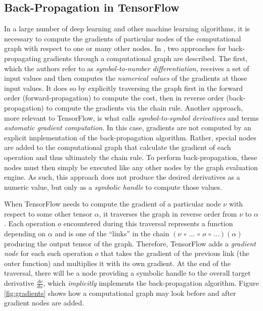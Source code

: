 \subsection{Back-Propagation in TensorFlow}\label{sec:model-ext-backprop}

In a large number of deep learning and other machine learning algorithms, it is
necessary to compute the gradients of particular nodes of the computational
graph with respect to one or many other nodes. In \cite{goodfellow2016}, two
approaches for back-propagating gradients through a computational graph are
described. The first, which the authors refer to as \emph{symbol-to-number
  differentiation}, receives a set of input values and then computes the
\emph{numerical values} of the gradients at those input values. It does so by
explicitly traversing the graph first in the forward order (forward-propagation)
to compute the cost, then in reverse order (back-propagation) to compute the
gradients via the chain rule. Another approach, more relevant to TensorFlow, is
what \cite{goodfellow2016} calls \emph{symbol-to-symbol derivatives} and
\cite{tensorflow} terms \emph{automatic gradient computation}. In this case,
gradients are not computed by an explicit implementation of the back-propagation
algorithm. Rather, special nodes are added to the computational graph that
calculate the gradient of each operation and thus ultimately the chain rule. To
perform back-propagation, these nodes must then simply be executed like any
other nodes by the graph evaluation engine. As such, this approach does not
produce the desired derivatives as a numeric value, but only as a \emph{symbolic
  handle} to compute those values.

When TensorFlow needs to compute the gradient of a particular node $\nu$ with
respect to some other tensor $\alpha$, it traverses the graph in reverse order
from $\nu$ to $\alpha$. Each operation $o$ encountered during this traversal
represents a function depending on $\alpha$ and is one of the ``links'' in the
chain $(\nu \,\circ\, \dots\, \circ\, o \,\circ\, \dots)(\alpha)$ producing the
output tensor of the graph. Therefore, TensorFlow adds a \emph{gradient node}
for each such operation $o$ that takes the gradient of the previous link (the
outer function) and multiplies it with its own gradient. At the end of the
traversal, there will be a node providing a symbolic handle to the overall
target derivative $\frac{d\nu}{d\alpha}$, which \emph{implicitly} implements the
back-propagation algorithm. Figure \ref{fig:gradients} shows how a computational
graph may look before and after gradient nodes are added.

